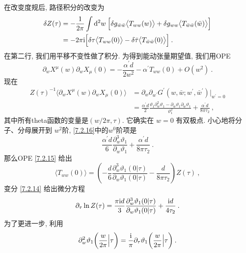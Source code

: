 在改变度规后, 路径积分的改变为
\begin{align}
	\delta Z(\tau) &= -\frac{1}{2 \pi} \int \mathrm{d}^{2} w \: \Bigl[\delta g_{\bar{w} \bar{w}} 
	\bigl\langle T_{w w}(w)\bigr\rangle+\delta g_{w w}\bigl\langle T_{\bar{w} \bar{w}}(\bar{w})\bigr\rangle\Bigr] \nonumber \\
	&=-2 \pi \mathrm{i}\Bigl[\delta \tau \bigl\langle T_{w w}(0)\bigr\rangle - \delta \bar{\tau}\bigl\langle T_{\bar{w} \bar{w}}(0)\bigr\rangle\Bigr] \:. \label{7.2.14}
\end{align}
在第二行, 我们用平移不变性做了积分. 为得到能动张量期望值, 我们用OPE
\begin{equation}
\partial_{w} X^{\mu}(w) \partial_{w} X_{\mu}(0)=-\frac{\alpha^{\prime} d}{2 w^{2}}-\alpha^{\prime} T_{w w}(0)+O(w^{2}) \:. \label{7.2.15}
\end{equation}
现在
\begin{align}
Z(\tau)^{-1}\langle\partial_{w} X^{\mu}(w) \partial_{w} X_{\mu}(0)\rangle 
&= \partial_{w} \partial_{w^{\prime}} G^{\prime}(w, \bar{w} ; w^{\prime}, \bar{w}^{\prime})|_{w^{\prime}=0} \nonumber \\
&=\frac{\alpha^{\prime} d}{2} \frac{\vartheta_{1} \partial_{w}^{2} \vartheta_{1}-\partial_{w} \vartheta_{1} \partial_{w} \vartheta_{1}}{\vartheta_{1}^{2}}+\frac{\alpha^{\prime} d}{8 \pi \tau_{2}} \:, \label{7.2.16}
\end{align}
其中所有theta函数的变量是$(w / 2 \pi, \tau)$. 它确实在 $w=0 $ 有双极点. 小心地将分子、分母展开到 $w^{2}$阶, \eqref{7.2.16}中的$w^{0}$阶项是
\begin{equation}
\frac{\alpha^{\prime} d}{6} \frac{\partial_{w}^{3} \vartheta_{1}}{\partial_{w} \vartheta_{1}}+\frac{\alpha^{\prime} d}{8 \pi \tau_{2}} \:.
\label{7.2.17}
\end{equation}
那么OPE \eqref{7.2.15} 给出
\begin{equation}
\langle T_{w w}(0)\rangle=\left(-\frac{d}{6} \frac{\partial_{w}^{3} \vartheta_{1}(0 \vert \tau)}{\partial_{w} \vartheta_{1}(0 \vert\tau)}-\frac{d}{8 \pi \tau_{2}}\right) Z(\tau) \:, \label{7.2.18}
\end{equation}
变分 \eqref{7.2.14} 给出微分方程
\begin{equation}
\partial_{\tau} \ln Z(\tau)=\frac{\pi \mathrm{i} d}{3} \frac{\partial_{w}^{3} \vartheta_{1}(0 \vert \tau)}{\partial_{w} \vartheta_{1}(0 \vert \tau)}+\frac{\mathrm{i} d}{4 \tau_{2}} \:. \label{7.2.19}
\end{equation}
为了更进一步, 利用
\begin{equation}
\partial_{w}^{2} \vartheta_{1}\biggl(\frac{w}{2 \pi} \Big\vert \tau\biggr) = 
\frac{\mathrm{i}}{\pi} \partial_{\tau} \vartheta_{1}\biggl(\frac{w}{2 \pi} \Big\vert \tau \biggr) \:. \label{7.2.20}
\end{equation}
